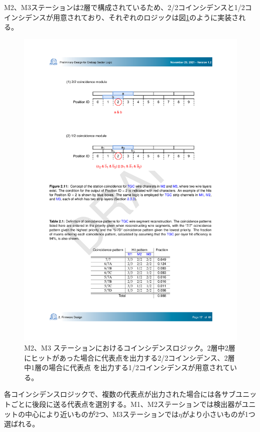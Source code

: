 M2、M3ステーションは2層で構成されているため、2/2コインシデンスと1/2コインシデンスが用意されており、それぞれのロジックは図\ref{StationCoin_doublet}のように実装される。
    
\begin{figure} 
\centering
\includegraphics[width=16cm]{fig/SL/StationCoin_doublet.pdf}
\caption[M2・M3 ステーションにおけるコインシデンスロジック]{M2、M3 ステーションにおけるコインシデンスロジック\cite{SLPDR}。2層中2層にヒットがあった場合に代表点を出力する2/2コインシデンス、2層中1層の場合に代表点
を出力する1/2コインシデンスが用意されている。}
\label{StationCoin_doublet}
\end{figure}

各コインシデンスロジックで、複数の代表点が出力された場合には各サブユニットごとに後段に送る代表点を選別する。M1、M2ステーションでは検出器がユニットの中心により近いものが2つ、M3ステーションでは$\eta$がより小さいものが1つ選ばれる。

